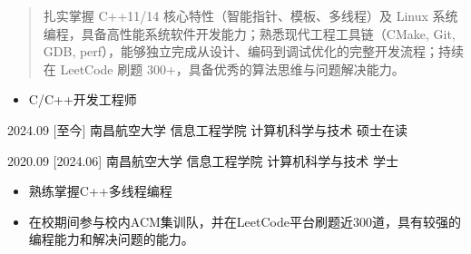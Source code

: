 \documentclass[zh]{resume}
\begin{document}
\makeheader

\begin{abstract}
扎实掌握 C++11/14 核心特性（智能指针、模板、多线程）及 Linux 系统编程，具备高性能系统软件开发能力；熟悉现代工程工具链（CMake, Git, GDB, perf），能够独立完成从设计、编码到调试优化的完整开发流程；持续在 LeetCode 刷题 300+，具备优秀的算法思维与问题解决能力。
\end{abstract}

\begin{itemize}
  \item C/C++开发工程师
\end{itemize}

\begin{competences}
\end{competences}

\begin{educations}
  \education%
    {2024.09}%
    [至今]%
    {南昌航空大学}%
    {信息工程学院}%
    {计算机科学与技术}%
    {硕士在读}

  \separator{0.5ex}
  \education%
    {2020.09}%
    [2024.06]%
    {南昌航空大学}%
    {信息工程学院}%
    {计算机科学与技术}%
    {学士}
\end{educations}

\begin{itemize}
  \item 熟练掌握C++多线程编程
  \item 在校期间参与校内ACM集训队，并在LeetCode平台刷题近300道，具有较强的编程能力和解决问题的能力。	
\end{itemize}
\end{document}
